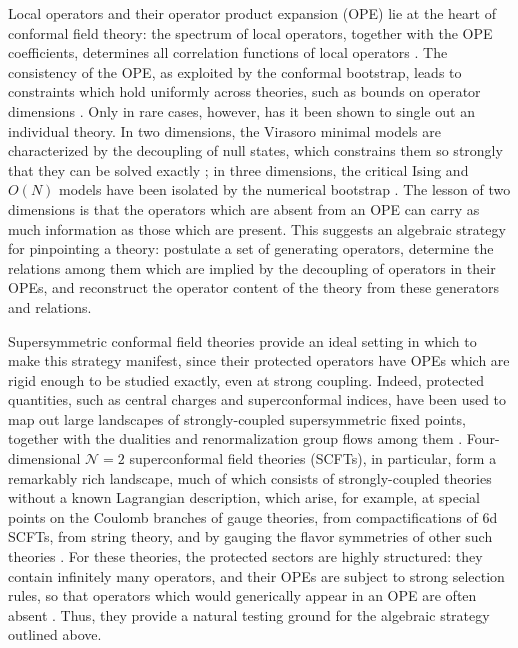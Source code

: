 \documentclass[12pt]{article}
\numberwithin{equation}{section}
\numberwithin{figure}{section}
\theoremstyle{plain}
\theoremstyle{definition}
\begin{document}
Local operators and their operator product expansion (OPE) lie at the heart of conformal field theory: the spectrum of local operators, together with the OPE coefficients, determines all correlation functions of local operators \cite{Ferrara:1973yt,Polyakov:1974gs}. The consistency of the OPE, as exploited by the conformal bootstrap, leads to constraints which hold uniformly across theories, such as bounds on operator dimensions \cite{Rattazzi:2008pe,Poland:2018epd}. Only in rare cases, however, has it been shown to single out an individual theory. In two dimensions, the Virasoro minimal models are characterized by the decoupling of null states, which constrains them so strongly that they can be solved exactly \cite{Belavin:1984vu}; in three dimensions, the critical Ising and $O(N)$ models have been isolated by the numerical bootstrap \cite{El-Showk:2012cjh,Kos:2014bka,Kos:2016ysd,Chester:2019ifh}. The lesson of two dimensions is that the operators which are absent from an OPE can carry as much information as those which are present. This suggests an algebraic strategy for pinpointing a theory: postulate a set of generating operators, determine the relations among them which are implied by the decoupling of operators in their OPEs, and reconstruct the operator content of the theory from these generators and relations.

Supersymmetric conformal field theories provide an ideal setting in which to make this strategy manifest, since their protected operators have OPEs which are rigid enough to be studied exactly, even at strong coupling. Indeed, protected quantities, such as central charges and superconformal indices, have been used to map out large landscapes of strongly-coupled supersymmetric fixed points, together with the dualities and renormalization group flows among them \cite{Kang:2021ccs,Kang:2022vab,Kang:2023dsa,Kang:2024elv,Kang:2024inx}. Four-dimensional $\mathcal{N}=2$ superconformal field theories (SCFTs), in particular, form a remarkably rich landscape, much of which consists of strongly-coupled theories without a known Lagrangian description, which arise, for example, at special points on the Coulomb branches of gauge theories, from compactifications of 6d SCFTs, from string theory, and by gauging the flavor symmetries of other such theories \cite{Argyres:1995jj,Argyres:1995xn,Minahan:1996fg,Minahan:1996cj,Gaiotto:2009we,Cecotti:2012jx,Cecotti:2013lda,Ohmori:2015pua,Ohmori:2015pia,Baume:2021qho,Kang:2021lic,Distler:2022yse,Distler:2022kjb,Couzens:2023kyf,Giacomelli:2024ycb,Giacomelli:2025zqn}. For these theories, the protected sectors are highly structured: they contain infinitely many operators, and their OPEs are subject to strong selection rules, so that operators which would generically appear in an OPE are often absent \cite{Liendo:2015ofa,Agarwal:2018zqi}. Thus, they provide a natural testing ground for the algebraic strategy outlined above.
\end{document}
